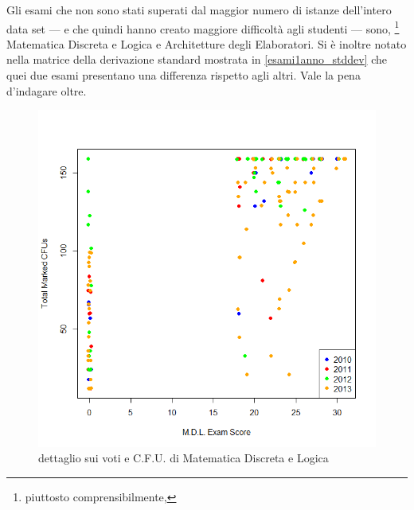                 Gli esami che non sono stati superati dal maggior numero di istanze dell’intero data set --- e che quindi hanno creato maggiore difficoltà agli studenti --- sono, \footnote{piuttosto comprensibilmente,} Matematica Discreta e Logica e Architetture degli Elaboratori. Si è inoltre notato nella matrice della derivazione standard mostrata in \ref{esami1anno_stddev} che quei due esami presentano una differenza rispetto agli altri. Vale la pena d'indagare oltre.

                \begin{figure}
                    \centering
                    \caption{dettaglio sui voti e C.F.U. di Matematica Discreta e Logica}
                    \label{mdl}
                	\includegraphics[scale=0.5]{img/scatter_plot_5.png}
                \end{figure}

